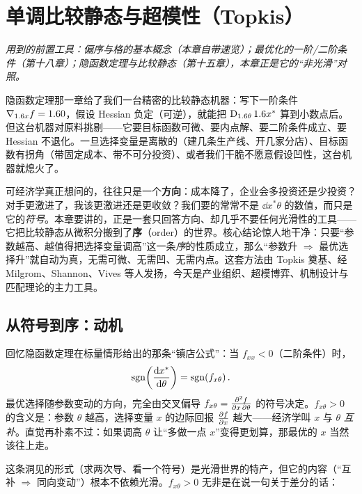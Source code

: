 \chapter{单调比较静态与超模性（Topkis）}
\label{ch:monotone}

\noindent\emph{用到的前置工具：偏序与格的基本概念（本章自带速览）；最优化的一阶/二阶条件（第十八章）；隐函数定理与比较静态（第十五章），本章正是它的``非光滑''对照。}
\medskip

隐函数定理那一章给了我们一台精密的比较静态机器：写下一阶条件 $\nabla_{1.6 x}f=1.6 0$，假设 Hessian 负定（可逆），就能把 $\operatorname{D}_{1.6\theta}1.6 x^*$ 算到小数点后。但这台机器对原料挑剔——它要目标函数可微、要内点解、要二阶条件成立、要 Hessian 不退化。一旦选择变量是离散的（建几条生产线、开几家分店）、目标函数有拐角（带固定成本、带不可分投资）、或者我们干脆不愿意假设凹性，这台机器就熄火了。

可经济学真正想问的，往往只是一个\textbf{方向}：成本降了，企业会多投资还是少投资？对手更激进了，我该更激进还是更收敛？我们要的常常不是 $\dd{x^*}{\theta}$ 的数值，而只是它的\emph{符号}。本章要讲的，正是一套只回答方向、却几乎不要任何光滑性的工具——它把比较静态从微积分搬到了\textbf{序}（order）的世界。核心结论惊人地干净：只要``参数越高、越值得把选择变量调高''这一条\emph{序}的性质成立，那么``参数升 $\Rightarrow$ 最优选择升''就自动为真，无需可微、无需凹、无需内点。这套方法由 Topkis 奠基、经 Milgrom、Shannon、Vives 等人发扬，今天是产业组织、超模博弈、机制设计与匹配理论的主力工具。

\section{从符号到序：动机}
\label{sec:monotone-1}

回忆隐函数定理在标量情形给出的那条``镇店公式''：当 $f_{xx}<0$（二阶条件）时，
\[
    \operatorname{sgn}\!\left(\frac{\mathop{}\!\mathrm{d} x^*}{\mathop{}\!\mathrm{d} \theta}\right)=\operatorname{sgn}\!\left(f_{x\theta}\right) .
\]
最优选择随参数变动的方向，完全由交叉偏导 $f_{x\theta}=\frac{\partial^2 f}{\partial x\,\partial \theta}$ 的符号决定。$f_{x\theta}>0$ 的含义是：参数 $\theta$ 越高，选择变量 $x$ 的边际回报 $\frac{\partial f}{\partial x}$ 越大——经济学叫 $x$ 与 $\theta$ \emph{互补}。直觉再朴素不过：如果调高 $\theta$ 让``多做一点 $x$''变得更划算，那最优的 $x$ 当然该往上走。

这条洞见的形式（求两次导、看一个符号）是光滑世界的特产，但它的内容（``互补 $\Rightarrow$ 同向变动''）根本不依赖光滑。$f_{x\theta}>0$ 无非是在说一句关于差分的话：


